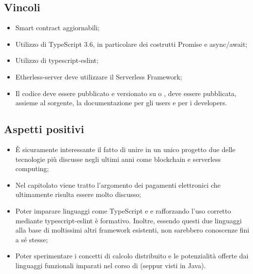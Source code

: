 \subsection{Vincoli}
\begin{itemize}
\item Smart contract aggiornabili;
\item Utilizzo di TypeScript 3.6, in particolare dei costrutti Promise e async/await;
\item Utilizzo di typescript-eslint;
\item Etherless-server deve utilizzare il Serverless Framework;
\item Il codice deve essere pubblicato e versionato su  o , deve essere pubblicata, assieme al sorgente, la documentazione per gli users e per i developers.
\end{itemize}

\subsection{Aspetti positivi}
\begin{itemize}
\item È sicuramente interessante il fatto di unire in un unico progetto due delle tecnologie più discusse negli ultimi anni come blockchain e serverless computing;
\item Nel capitolato viene tratto l'argomento dei pagamenti elettronici che ultimamente risulta essere molto discusso;
\item Poter imparare linguaggi come TypeScript e  e rafforzando l'uso corretto mediante typescript-eslint \`e formativo. Inoltre, essendo questi due linguaggi alla base di moltissimi altri framework esistenti, non sarebbero conoscenze fini a sé stesse;
\item Poter sperimentare i concetti di calcolo distribuito e le potenzialità offerte dai linguaggi funzionali imparati nel corso di  (seppur visti in Java).
\end{itemize}

